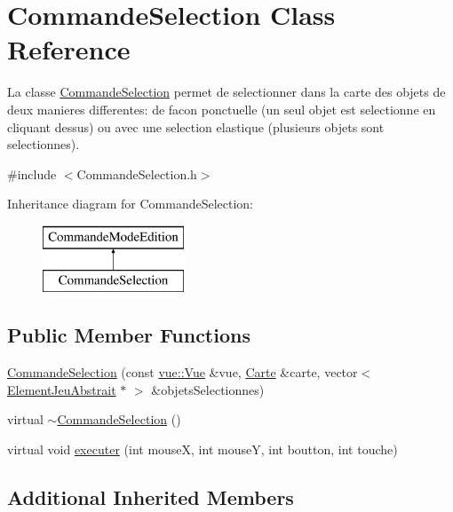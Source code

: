 \hypertarget{class_commande_selection}{\section{Commande\-Selection Class Reference}
\label{class_commande_selection}
}


La classe \hyperlink{class_commande_selection}{Commande\-Selection} permet de selectionner dans la carte des objets de deux manieres differentes\-: de facon ponctuelle (un seul objet est selectionne en cliquant dessus) ou avec une selection elastique (plusieurs objets sont selectionnes).  




{\ttfamily \#include $<$Commande\-Selection.\-h$>$}

Inheritance diagram for Commande\-Selection\-:\begin{figure}[H]
\begin{center}
\leavevmode
\includegraphics[height=2.000000cm]{class_commande_selection}
\end{center}
\end{figure}
\subsection*{Public Member Functions}
\begin{DoxyCompactItemize}
\item 
\hyperlink{class_commande_selection_a144fe79ec6aefd6f1e684f71c2eb7dc8}{Commande\-Selection} (const \hyperlink{classvue_1_1_vue}{vue\-::\-Vue} \&vue, \hyperlink{class_carte}{Carte} \&carte, vector$<$ \hyperlink{class_element_jeu_abstrait}{Element\-Jeu\-Abstrait} $\ast$ $>$ \&objets\-Selectionnes)
\item 
virtual \hyperlink{class_commande_selection_a3c35456e80063269a01c2057fd96e82f}{$\sim$\-Commande\-Selection} ()
\item 
virtual void \hyperlink{class_commande_selection_a1fdf079ab482bbcceb87a7d2eb72c7be}{executer} (int mouse\-X, int mouse\-Y, int boutton, int touche)
\end{DoxyCompactItemize}
\subsection*{Additional Inherited Members}


